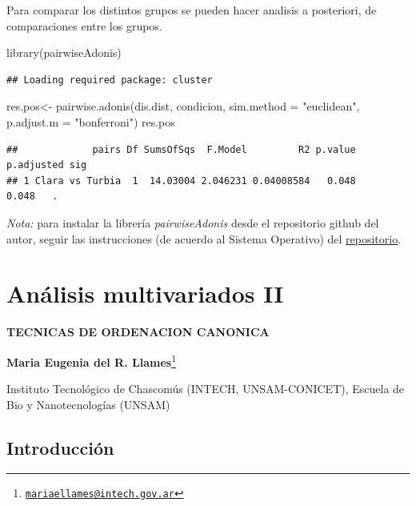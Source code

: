 \documentclass[
]{book}
\newenvironment{Shaded}{\begin{snugshade}}{\end{snugshade}}
\newcommand{\AttributeTok}[1]{\textcolor[rgb]{0.77,0.63,0.00}{#1}}
\newcommand{\FunctionTok}[1]{\textcolor[rgb]{0.00,0.00,0.00}{#1}}
\newcommand{\NormalTok}[1]{#1}
\newcommand{\OtherTok}[1]{\textcolor[rgb]{0.56,0.35,0.01}{#1}}
\newcommand{\StringTok}[1]{\textcolor[rgb]{0.31,0.60,0.02}{#1}}
\begin{document}
Para comparar los distintos grupos se pueden hacer analisis a posteriori, de comparaciones entre los grupos.

\begin{Shaded}
\begin{Highlighting}[]
\FunctionTok{library}\NormalTok{(pairwiseAdonis)}
\end{Highlighting}
\end{Shaded}

\begin{verbatim}
## Loading required package: cluster
\end{verbatim}

\begin{Shaded}
\begin{Highlighting}[]
\NormalTok{res.pos}\OtherTok{\textless{}{-}} \FunctionTok{pairwise.adonis}\NormalTok{(dis.dist, condicion, }\AttributeTok{sim.method =} \StringTok{"euclidean"}\NormalTok{, }\AttributeTok{p.adjust.m =} \StringTok{"bonferroni"}\NormalTok{)}
\NormalTok{res.pos}
\end{Highlighting}
\end{Shaded}

\begin{verbatim}
##             pairs Df SumsOfSqs  F.Model         R2 p.value p.adjusted sig
## 1 Clara vs Turbia  1  14.03004 2.046231 0.04008584   0.048      0.048   .
\end{verbatim}

\emph{Nota:} para instalar la librería \emph{pairwiseAdonis} desde el repositorio github del autor, seguir las instrucciones (de acuerdo al Sistema Operativo) del \href{https://github.com/pmartinezarbizu/pairwiseAdonis}{repositorio}.

\hypertarget{multi2}{%
\chapter{Análisis multivariados II}\label{multi2}}

\textbf{TECNICAS DE ORDENACION CANONICA}

\textbf{Maria Eugenia del R. Llames}\footnote{\href{mailto:mariaellames@intech.gov.ar}{\nolinkurl{mariaellames@intech.gov.ar}}}

Instituto Tecnológico de Chascomús (INTECH, UNSAM-CONICET), Escuela de Bio y Nanotecnologías (UNSAM)

\hypertarget{introducciuxf3n-1}{%
\section{Introducción}\label{introducciuxf3n-1}}
\end{document}
